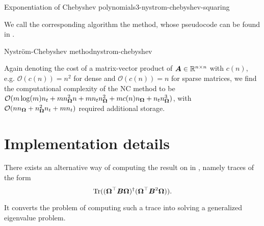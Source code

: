 \begin{algo}{Exponentiation of Chebyshev polynomials}{3-nystrom-chebyshev-squaring}
    
\end{algo}

We call the corresponding algorithm the  method, whose pseudocode
can be found in .
\begin{algo}{Nystr\"om-Chebyshev method}{nystrom-chebyshev}
    
\end{algo}

Again denoting the cost of a matrix-vector product of $\boldsymbol{A} \in \mathbb{R}^{n \times n}$
with $c(n)$, e.g. $\mathcal{O}(c(n)) = n^2$ for dense and $\mathcal{O}(c(n)) = n$
for sparse matrices, we find the computational complexity of the \gls{NC}
method to be $\mathcal{O}(m \log(m) n_t + m n_{\boldsymbol{\Omega}}^2 n + m n_t n_{\boldsymbol{\Omega}}^2 +  m c(n) n_{\boldsymbol{\Omega}} + n_t n_{\boldsymbol{\Omega}}^3)$, with
$\mathcal{O}(n n_{\boldsymbol{\Omega}} + n_{\boldsymbol{\Omega}}^2 n_t + m n_t)$ required additional storage.


\section{Implementation details}
\label{sec:3-nystrom-implementation-details}

There exists an alternative way of computing the result on 
in , namely traces of the form
\begin{equation}
    \operatorname{Tr}((\boldsymbol{\Omega}^{\top} \boldsymbol{B} \boldsymbol{\Omega})^{\dagger}(\boldsymbol{\Omega}^{\top} \boldsymbol{B}^2 \boldsymbol{\Omega})).
    \label{equ:3-nystrom-trace-pseudo-inverse}
\end{equation}

It converts the problem of computing such a trace into solving a generalized
eigenvalue problem.

